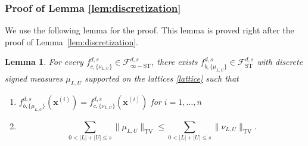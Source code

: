 \documentclass[10pt]{article}
\newtheorem{lemma}{Lemma}
\newcommand{\fst}{{\mathcal{F}^{d, s}_{\text{ST}}}}
\newcommand{\fstinf}{{\mathcal{F}^{d, s}_{\infty-\text{ST}}}}
\newcommand{\fcnu}{{f^{d, s}_{c, \{\nu_{L, U}\}}}}
\newcommand{\xbf}{{\mathbf{x}}}
\begin{document}
\subsubsection{Proof of Lemma \ref{lem:discretization}}
\label{pf:discretization}
We use the following lemma for the proof. 
This lemma is proved right after the proof of 
Lemma~\ref{lem:discretization}.
\begin{lemma}\label{lem:reduction-to-discrete-measures}
    For every $\fcnu \in \fstinf$, there exists 
    $f^{d, s}_{b, \{\mu_{L, U}\}} \in \fst$ with discrete signed 
    measures $\mu_{L, U}$ supported on the lattices \eqref{lattice} 
    such that 
    \begin{enumerate}[label = (\alph*)]
    \item $f^{d, s}_{b, \{\mu_{L, U}\}}(\xbf^{(i)})
    = \fcnu(\xbf^{(i)})$ for $i = 1, \dots, n$
    \item 
    \begin{equation*}
        \sum_{0 < |L| + |U| \le s} \|\mu_{L, U}\|_{\text{TV}} 
        \le \sum_{0 < |L| + |U| \le s} \|\nu_{L, U}\|_{\text{TV}}.
    \end{equation*}
    \end{enumerate}
\end{lemma}
\end{document}
